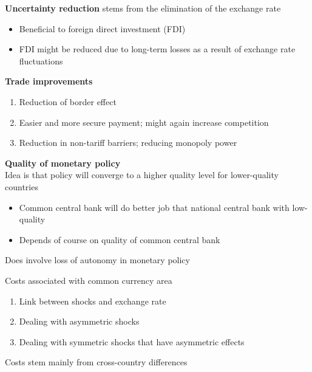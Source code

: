 \documentclass{beamer}
\begin{document}
\begin{frame}
  \textbf{Uncertainty reduction} stems from the elimination of the exchange rate
  \begin{itemize}
    \item Beneficial to foreign direct investment (FDI)
    \item FDI might be reduced due to long-term losses as a result of exchange rate fluctuations
  \end{itemize}
\end{frame}

\begin{frame}
  \textbf{Trade improvements}
  \begin{enumerate}
    \item Reduction of border effect
    \item Easier and more secure payment; might again increase competition
    \item Reduction in non-tariff barriers; reducing monopoly power
  \end{enumerate}
\end{frame}

\begin{frame}
  \textbf{Quality of monetary policy}\\
  Idea is that policy will converge to a higher quality level for lower-quality countries
  \begin{itemize}
    \item Common central bank will do better job that national central bank with low-quality
    \item Depends of course on quality of common central bank
  \end{itemize}
  \medskip
  Does involve loss of autonomy in monetary policy
\end{frame}

\begin{frame}
  Costs associated with common currency area
  \begin{enumerate}
    \item Link between shocks and exchange rate
    \item Dealing with asymmetric shocks
    \item Dealing with symmetric shocks that have asymmetric effects
  \end{enumerate}
  \medskip
  Costs stem mainly from cross-country differences
\end{frame}
\end{document}

